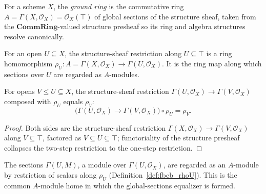 \begin{definition}
  \label{def:fbcb_groundRing}
  For a scheme \(X\), the \emph{ground ring} is the commutative ring
  \(A = \Gamma(X, \mathcal{O}_X) = \mathcal{O}_X(\top)\) of global sections of the structure sheaf,
  taken from the \(\mathbf{CommRing}\)-valued structure presheaf so its ring and algebra structures
  resolve canonically.
\end{definition}

\begin{definition}
  \label{def:fbcb_rhoU}
  For an open \(U \subseteq X\), the structure-sheaf restriction along \(U \subseteq \top\) is a ring
  homomorphism \(\rho_U : A = \Gamma(X,\mathcal{O}_X) \to \Gamma(U,\mathcal{O}_X)\). It is the ring map
  along which sections over \(U\) are regarded as \(A\)-modules.
\end{definition}

\begin{lemma}
  \label{lem:fbcb_rhoU_comp}
  For opens \(V \le U \subseteq X\), the structure-sheaf restriction
  \(\Gamma(U,\mathcal{O}_X) \to \Gamma(V,\mathcal{O}_X)\) composed with \(\rho_U\) equals \(\rho_V\):
  \[
    \bigl(\Gamma(U,\mathcal{O}_X) \to \Gamma(V,\mathcal{O}_X)\bigr) \circ \rho_U = \rho_V .
  \]
  \begin{proof}
    Both sides are the structure-sheaf restriction \(\Gamma(X,\mathcal{O}_X) \to \Gamma(V,\mathcal{O}_X)\)
    along \(V \subseteq \top\), factored as \(V \subseteq U \subseteq \top\); functoriality of the
    structure presheaf collapses the two-step restriction to the one-step restriction.
  \end{proof}
\end{lemma}

\begin{definition}
  \label{def:fbcb_gammaModA}
  The sections \(\Gamma(U, M)\), a module over \(\Gamma(U,\mathcal{O}_X)\), are regarded as an
  \(A\)-module by restriction of scalars along \(\rho_U\) (Definition~\ref{def:fbcb_rhoU}). This is the
  common \(A\)-module home in which the global-sections equalizer is formed.
\end{definition}


